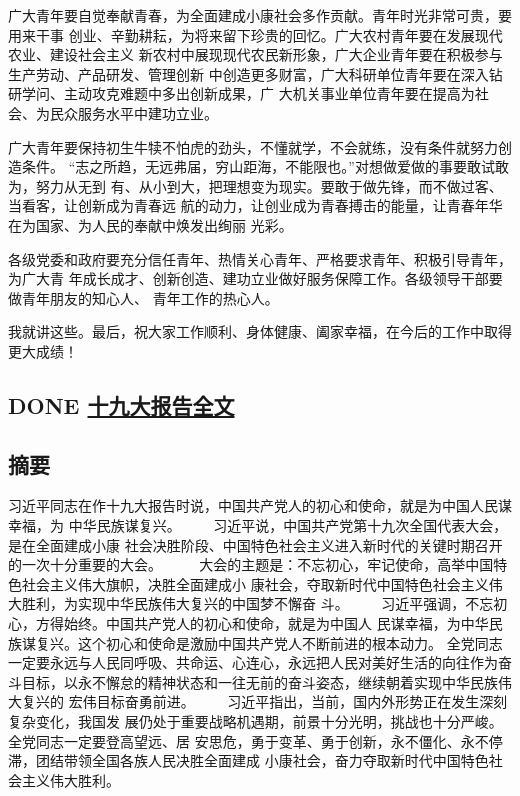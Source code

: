 \documentclass[11pt]{ctexart}
\begin{document}
{{{{广大青年要自觉奉献青春，为全面建成小康社会多作贡献。青年时光非常可贵，要用来干事
创业、辛勤耕耘，为将来留下珍贵的回忆。广大农村青年要在发展现代农业、建设社会主义
新农村中展现现代农民新形象，广大企业青年要在积极参与生产劳动、产品研发、管理创新
中创造更多财富，广大科研单位青年要在深入钻研学问、主动攻克难题中多出创新成果，广
大机关事业单位青年要在提高为社会、为民众服务水平中建功立业。

广大青年要保持初生牛犊不怕虎的劲头，不懂就学，不会就练，没有条件就努力创造条件。
“志之所趋，无远弗届，穷山距海，不能限也。”对想做爱做的事要敢试敢为，努力从无到
有、从小到大，把理想变为现实。要敢于做先锋，而不做过客、当看客，让创新成为青春远
航的动力，让创业成为青春搏击的能量，让青春年华在为国家、为人民的奉献中焕发出绚丽
光彩。

各级党委和政府要充分信任青年、热情关心青年、严格要求青年、积极引导青年，为广大青
年成长成才、创新创造、建功立业做好服务保障工作。各级领导干部要做青年朋友的知心人、
青年工作的热心人。

我就讲这些。最后，祝大家工作顺利、身体健康、阖家幸福，在今后的工作中取得更大成绩！
\subsection{{\bfseries\sffamily DONE} \href{http://www.liuxue86.com/a/3351261.html}{十九大报告全文}}
\label{sec:org7b77008}
\subsection{摘要}
\label{sec:orgd2da772}

习近平同志在作十九大报告时说，中国共产党人的初心和使命，就是为中国人民谋幸福，为
中华民族谋复兴。
　　习近平说，中国共产党第十九次全国代表大会，是在全面建成小康
社会决胜阶段、中国特色社会主义进入新时代的关键时期召开的一次十分重要的大会。
　
　大会的主题是：不忘初心，牢记使命，高举中国特色社会主义伟大旗帜，决胜全面建成小
康社会，夺取新时代中国特色社会主义伟大胜利，为实现中华民族伟大复兴的中国梦不懈奋
斗。
　　习近平强调，不忘初心，方得始终。中国共产党人的初心和使命，就是为中国人
民谋幸福，为中华民族谋复兴。这个初心和使命是激励中国共产党人不断前进的根本动力。
全党同志一定要永远与人民同呼吸、共命运、心连心，永远把人民对美好生活的向往作为奋
斗目标，以永不懈怠的精神状态和一往无前的奋斗姿态，继续朝着实现中华民族伟大复兴的
宏伟目标奋勇前进。
　　习近平指出，当前，国内外形势正在发生深刻复杂变化，我国发
展仍处于重要战略机遇期，前景十分光明，挑战也十分严峻。全党同志一定要登高望远、居
安思危，勇于变革、勇于创新，永不僵化、永不停滞，团结带领全国各族人民决胜全面建成
小康社会，奋力夺取新时代中国特色社会主义伟大胜利。
}}}}
\end{document}
